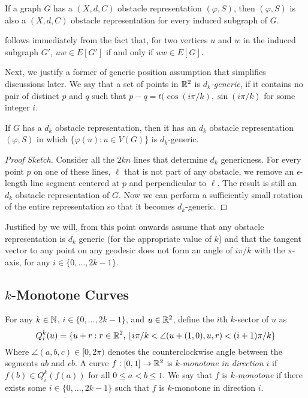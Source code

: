 \documentclass{patmorin}
\newcommand{\eps}{\epsilon}
\begin{document}
\begin{obs}
   If a graph $G$ has a $(X,d,C)$ obstacle representation
   $(\varphi,S)$, then   $(\varphi, S)$ is also a $(X,d,C)$ obstacle
   representation for every induced subgraph of $G$.
\end{obs}

 follows immediately from the fact that, for two vertices
$u$ and $w$ in the induced subgraph $G'$, $uw\in E[G']$ if and only if
$uw\in E[G]$.

Next, we justify a former of generic position assumption that
simplifies discussions later.  We say that a set of points in $\mathbb{R}^2$
is \emph{$d_k$-generic}, if it contains no pair of distinct $p$ and $q$
such that $p-q= t(\cos(i\pi/k),\sin(i\pi/k)$ for some integer $i$.

\begin{obs}
  If $G$ has a $d_k$ obstacle representation, then it
  has an $d_k$ obstacle representation $(\varphi, S)$
  in which $\{\varphi(u):u\in V(G)\}$ is $d_k$-generic.
\end{obs}

\begin{proof}[Proof Sketch]
   Consider all the $2kn$ lines that determine $d_k$ genericness.
   For every point $p$ on one of these lines, $\ell$ that is not
   part of any obstacle, we remove an $\eps$-length line segment
   centered at $p$ and perpendicular to $\ell$. The result is still
   an $d_k$ obstacle representation of $G$.  Now we can
   perform a sufficiently small rotation of the entire representation
   so that it becomes $d_k$-generic.
\end{proof}

Justified by  we will, from this point onwards
assume that any obstacle representation is $d_k$ generic (for the
appropriate value of $k$) and that the tangent vector to any point on
any geodesic does not form an angle of $i\pi/k$ with the x-axis, for
any $i\in\{0,\ldots,2k-1\}$.

\subsection{$k$-Monotone Curves}

For any $k\in\mathbb{N}$, $i\in\{0,\ldots,2k-1\}$, and $u\in\mathbb{R}^2$, define the
$i$th $k$-sector of $u$ as
\[
   Q^{k}_i(u) = 
     \{ u+r: r\in\mathbb{R}^2,\,\lfloor i\pi/k < \angle(u+(1,0),u,r) < (i+1)\pi/k \}
\]
Where $\angle (a,b,c)\in[0,2\pi)$ denotes the counterclockwise angle
between the segments $ab$ and $cb$.  A curve $f:[0,1]\to\mathbb{R}^2$ is
\emph{$k$-monotone in direction $i$} if $f(b)\in Q^k_i(f(a))$ for all
$0 \le a < b \le 1$.  We say that $f$ is \emph{$k$-monotone} if there
exists some $i\in\{0,\ldots,2k-1\}$ such that $f$ is $k$-monotone in
direction $i$.  
\end{document}

